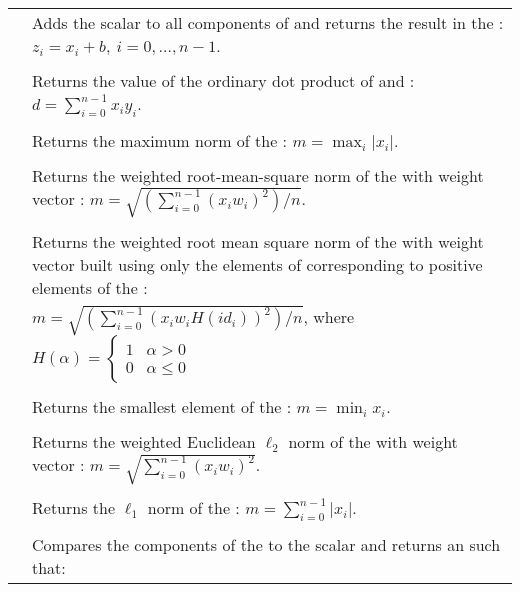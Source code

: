 \begin{xtabular}{|p{\colone}|p{\coltwo}|}
& Adds the  scalar  to all components of  
and returns the result in the  :
$z_i = x_i + b , \: i=0,\ldots,n-1$.
\\[2mm]
 &  \\
& Returns the value of the ordinary dot product of  and :
$d=\sum_{i=0}^{n-1} x_i y_i$.
\\[2mm]
 &  \\
& Returns the maximum norm of the  :
$m = \max_{i} | x_i |$.
\\[2mm]
 &  \\
& Returns the weighted root-mean-square norm of the   with
 weight vector :
$m = \sqrt{\left( \sum_{i=0}^{n-1} (x_i w_i)^2 \right) / n}$.
\\[2mm]
 &  \\
& Returns the weighted root mean square norm of the   with
 weight vector  built using only 
the elements of  corresponding to
positive elements of the  :\\
&$m = \sqrt{\left( \sum_{i=0}^{n-1} (x_i w_i H(id_i))^2 \right) / n}$,
where
$
H(\alpha) =
\begin{cases} 
1 & \alpha > 0 \\
0 & \alpha \leq 0
\end{cases}
$
\\[2mm]
 &  \\
& Returns the smallest element of the  :
$m = \min_i x_i $.
\\[2mm]
 &  \\
& Returns the weighted Euclidean $\ell_2$ norm of the  
with  weight vector : 
$m = \sqrt{\sum_{i=0}^{n-1} (x_i w_i)^2}$.
\\[2mm]
 &  \\
& Returns the $\ell_1$ norm of the  :
$m = \sum_{i=0}^{n-1} | x_i |$.
\\[2mm]
 &  \\
& Compares the components of the   to the 
scalar  and returns an   such that:

\end{xtabular}
